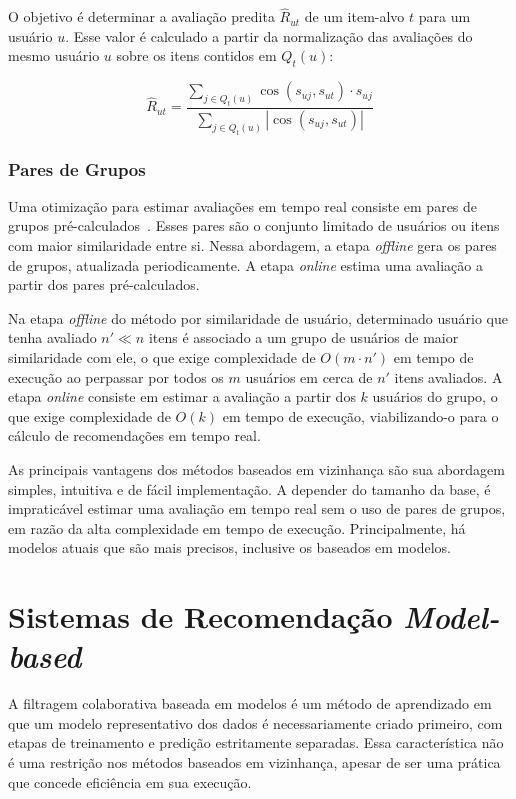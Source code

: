 O objetivo é determinar a avaliação predita $\hat{R}_{ut}$ de um item-alvo $t$ para um usuário
$u$. Esse valor é calculado a partir da normalização das avaliações do mesmo
usuário $u$ sobre os itens contidos em $Q_t (u)$:

\begin{equation}
    \hat{R}_{ut} = \frac{\sum_{j \in Q_t(u)} \cos(s_{uj},s_{ut}) \cdot s_{uj}}{\sum_{j \in Q_t(u)} |\cos(s_{uj},s_{ut})|}
\end{equation}

\subsubsection{Pares de Grupos}

Uma otimização para estimar avaliações em tempo real consiste em pares de grupos
pré-calculados~\cite{aggarwal2016recommender}. Esses pares são o conjunto limitado de usuários ou itens com
maior similaridade entre si. Nessa abordagem, a etapa \textit{offline} gera os
pares de grupos, atualizada periodicamente. A etapa \textit{online} estima uma
avaliação a partir dos pares pré-calculados.

Na etapa \textit{offline} do método por similaridade de usuário, determinado
usuário que tenha avaliado $n' \ll n$ itens é associado a um grupo de usuários
de maior similaridade com ele, o que exige complexidade de $O(m \cdot n')$ em
tempo de execução ao perpassar por todos os $m$ usuários em cerca de $n'$ itens
avaliados. A etapa \textit{online} consiste em estimar a avaliação a partir dos
$k$ usuários do grupo, o que exige complexidade de $O(k)$ em tempo de execução,
viabilizando-o para o cálculo de recomendações em tempo real.
 
As principais vantagens dos métodos baseados em vizinhança são sua abordagem
simples, intuitiva e de fácil implementação. A depender do tamanho da base, é
impraticável estimar uma avaliação em tempo real sem o uso de pares de grupos,
em razão da alta complexidade em tempo de execução. Principalmente,
há modelos atuais que são mais precisos, inclusive os baseados em modelos.

\section{Sistemas de Recomendação \textit{Model-based}}
A filtragem colaborativa baseada em modelos é um método de aprendizado em que um
modelo representativo dos dados é necessariamente criado primeiro, com etapas de
treinamento e predição estritamente separadas. Essa característica  não é uma
restrição nos métodos baseados em vizinhança, apesar de ser uma prática que
concede eficiência em sua execução.

